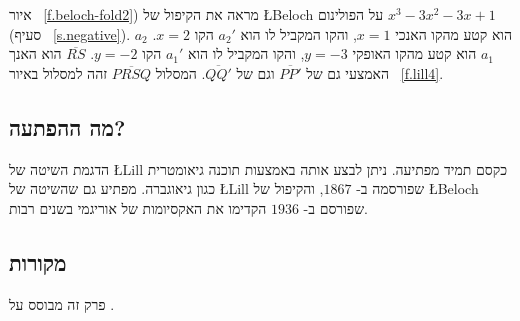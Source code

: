 איור%
~\ref{f.beloch-fold2})
מראה את הקיפול של 
\L{Beloch}
על הפולינום
$x^3-3x^2-3x+1$
(סעיף%
~\ref{s.negative}).
$a_2$
הוא קטע מהקו האנכי 
$x=1$,
והקו המקביל לו הוא
$a_2'$
הקו
$x=2$.
$a_1$
הוא קטע מהקו האופקי 
$y=-3$,
והקו המקביל לו הוא
$a_1'$
הקו
$y=-2$.
$\overline{RS}$
הוא האנך האמצעי גם של
$\overline{PP'}$
וגם של
$\overline{QQ'}$.
המסלול
$\overline{PRSQ}$
זהה למסלול באיור%
~\ref{f.lill4}.


\subsection*{מה ההפתעה?}

הדגמת השיטה של
\L{Lill}
כקסם תמיד מפתיעה. ניתן לבצע אותה באמצעות תוכנה גיאומטרית כגון גיאוגברה. מפתיע גם שהשיטה של
\L{Lill}
שפורסמה ב-%
$1867$,
והקיפול של
\L{Beloch}
שפורסם ב-%
$1936$
הקדימו את האקסיומות של אוריגמי בשנים רבות.

\subsection*{מקורות}

פרק זה מבוסס על
\cite{bradford, hull-beloch, riaz}.
